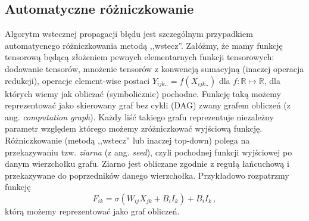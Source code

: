 \documentclass{myclass}
\begin{document}
\subsection{Automatyczne różniczkowanie}

Algorytm wstecznej propagacji błędu jest szczególnym przypadkiem automatycnego różniczkowania metodą
,,wstecz''. Załóżmy, że mamy funkcję tensorową będącą złożeniem pewnych elementarnych funkcji
tensorowych: dodawanie tensorów, mnożenie tensorów z konwencją sumacyjną (inaczej operacja
redukcji), operacje element-wise postaci \(Y_{ijk..} = f(X_{ijk..})\) dla
\(f:\mathbb{R}\mapsto\mathbb{R}\), dla których wiemy jak obliczać (symbolicznie) pochodne. Funkcję
taką możemy reprezentować jako skierowany graf bez cykli (DAG) zwany grafem obliczeń (z ang.
\textit{computation graph}). Każdy liść takiego grafu reprezentuje niezależny parametr względem
którego możemy zróżniczkować wyjściową funkcję. Różniczkowanie (metodą ,,wstecz'' lub inaczej
top-down) polega na przekazywaniu tzw. \textit{ziarna} (z ang. \textit{seed}), czyli pochodnej
funkcji wyjściowej po danym wierzchołku grafu. Ziarno jest obliczane zgodnie z regułą łańcuchową i
przekazywane do poprzedników danego wierzchołka. Przykładowo rozpatrzmy funkcję
\begin{equation*}
    F_{ik} = \sigma\left(W_{ij}X_{jk} + B_{i}I_k\right) + B_{i}I_{k}\,,
\end{equation*}
którą możemy reprezentować jako graf obliczeń.
\end{document}
